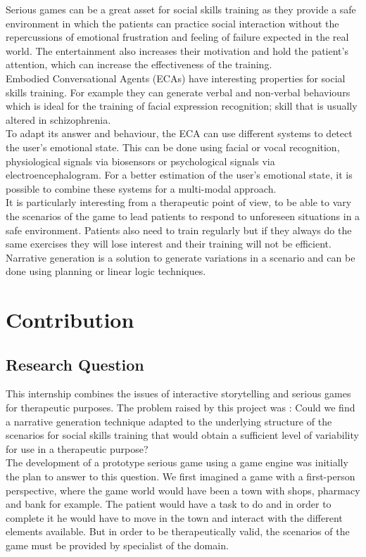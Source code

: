 \documentclass[11pt]{article}
\begin{document}
Serious games can be a great asset for social skills training as they provide a safe environment in which the patients can practice social interaction without the repercussions of emotional frustration and feeling of failure expected in the real world. The entertainment also increases their motivation and hold the patient's attention, which can increase the effectiveness of the training.\\

Embodied Conversational Agents (ECAs) have interesting properties for social skills training. For example they can generate verbal and non-verbal behaviours which is ideal for the training of facial expression recognition; skill that is usually altered in schizophrenia.\\

To adapt its answer and behaviour, the ECA can use different systems to detect the user's emotional state. This can be done using facial or vocal recognition, physiological signals via biosensors or psychological signals via electroencephalogram. For a better estimation of the user's emotional state, it is possible to combine these systems for a multi-modal approach. \\

It is particularly interesting from a therapeutic point of view, to be able to vary the scenarios of the game to lead patients to respond to unforeseen situations in a safe environment. Patients also need to train regularly but if they always do the same exercises they will lose interest and their training will not be efficient. Narrative generation is a solution to generate variations in a scenario and can be done using planning or linear logic techniques.
\newpage
\section{Contribution} \label{sec: Contribution}
\subsection{Research Question}
This internship combines the issues of interactive storytelling and serious games for therapeutic purposes. The problem raised by this project was : Could we find a narrative generation technique adapted to the underlying structure of the scenarios for social skills training that would obtain a sufficient level of variability for use in a therapeutic purpose? \\

The development of a prototype serious game using a game engine was initially the plan to answer to this question. We first imagined a game with a first-person perspective, where the game world would have been a town with shops, pharmacy and bank for example. The patient would have a task to do and in order to complete it he would have to move in the town and interact with the different elements available. But in order to be therapeutically valid, the scenarios of the game must be provided by specialist of the domain.\\
\end{document}
